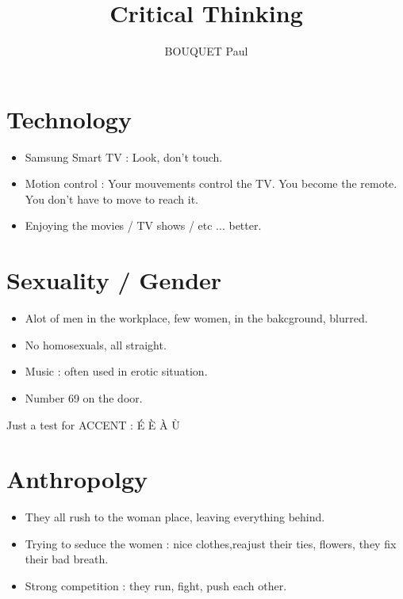 \documentclass{article}
\title{Critical Thinking}
\author{BOUQUET Paul}
\date{\vspace{-5ex}}
\begin{document}
\maketitle

\section{Technology}

\begin{itemize}

	\item Samsung Smart TV : Look, don't touch.

	\item Motion control : Your mouvements control the TV. You become the remote.
	      You don't have to move to reach it.

	\item Enjoying the movies / TV shows / etc ... better.

\end{itemize}

\section{Sexuality / Gender}

\begin{itemize}

	\item Alot of men in the workplace, few women, in the bakcground, blurred.

	\item No homosexuals, all straight.

	\item Music : often used in erotic situation.

	\item Number 69 on the door.

\end{itemize}

Just a test for ACCENT : É È À Ù

\section{Anthropolgy}

\begin{itemize}

	\item They all rush to the woman place, leaving everything behind.

	\item Trying to seduce the women : nice clothes,reajust their ties, flowers, they fix their bad breath.

	\item Strong competition : they run, fight, push each other.

\end{itemize}
\end{document}
